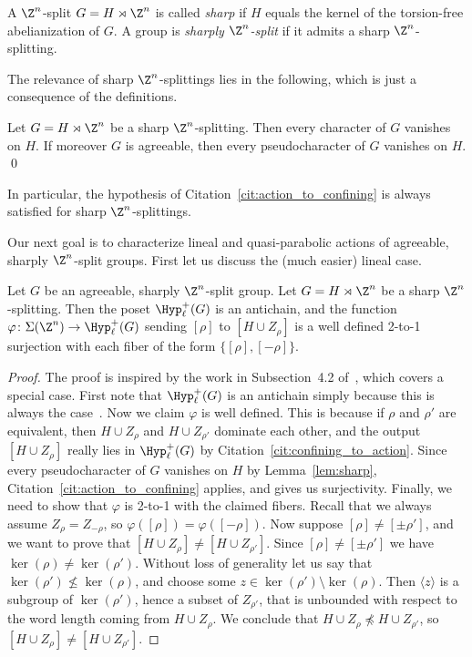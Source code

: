 \begin{defi}
    A $\Z^n$-split $G = H \rtimes \Z^n$ is called \emph{sharp} if $H$ equals the kernel of the torsion-free abelianization of $G$. A group is \emph{sharply $\Z^n$-split} if it admits a sharp $\Z^n$-splitting.
\end{defi}

The relevance of sharp $\Z^n$-splittings lies in the following, which is just a consequence of the definitions.

\begin{lemm}\label{lem:sharp}
Let $G = H \rtimes \Z^n$ be a sharp $\Z^n$-splitting. Then every character of $G$ vanishes on $H$. If moreover $G$ is agreeable, then every pseudocharacter of $G$ vanishes on $H$. \qed
\end{lemm}

In particular, the hypothesis of Citation~\ref{cit:action_to_confining} is always satisfied for sharp $\Z^n$-splittings.

Our next goal is to characterize lineal and quasi-parabolic actions of agreeable, sharply $\Z^n$-split groups. First let us discuss the (much easier) lineal case.

\begin{prop}\label{prop:lineal}
Let $G$ be an agreeable, sharply $\Z^n$-split group. Let $G=H\rtimes\Z^n$ be a sharp $\Z^n$-splitting. Then the poset $\Hyp_\ell^+(G)$ is an antichain, and the function $\varphi \colon \Sigma(\Z^n)\to \Hyp_\ell^+(G)$ sending $[\rho]$ to $[H\cup Z_\rho]$ is a well defined 2-to-1 surjection with each fiber of the form $\{[\rho],[-\rho]\}$.
\end{prop}

\begin{proof}
The proof is inspired by the work in Subsection~4.2 of~\cite{confining}, which covers a special case. First note that $\Hyp_\ell^+(G)$ is an antichain simply because this is always the case~\cite[Theorem~4.22(a)]{ABO}. Now we claim $\varphi$ is well defined. This is because if $\rho$ and $\rho'$ are equivalent, then $H\cup Z_\rho$ and $H\cup Z_{\rho'}$ dominate each other, and the output $[H\cup Z_\rho]$ really lies in $\Hyp_\ell^+(G)$ by Citation~\ref{cit:confining_to_action}. Since every pseudocharacter of $G$ vanishes on $H$ by Lemma~\ref{lem:sharp}, Citation~\ref{cit:action_to_confining} applies, and gives us surjectivity. Finally, we need to show that $\varphi$ is 2-to-1 with the claimed fibers. Recall that we always assume $Z_{\rho} = Z_{-\rho}$, so $\varphi([\rho])=\varphi([-\rho])$. Now suppose $[\rho]\ne[\pm\rho']$, and we want to prove that $[H\cup Z_\rho]\ne[H\cup Z_{\rho'}]$. Since $[\rho]\ne[\pm\rho']$ we have $\ker(\rho)\ne \ker(\rho')$. Without loss of generality let us say that $\ker(\rho')\not\le \ker(\rho)$, and choose some $z\in \ker(\rho')\setminus \ker(\rho)$. Then $\langle z\rangle$ is a subgroup of $\ker(\rho')$, hence a subset of $Z_{\rho'}$, that is unbounded with respect to the word length coming from $H\cup Z_\rho$. We conclude that $H\cup Z_\rho\not\preceq H\cup Z_{\rho'}$, so $[H\cup Z_\rho]\ne[H\cup Z_{\rho'}]$.
\end{proof}

